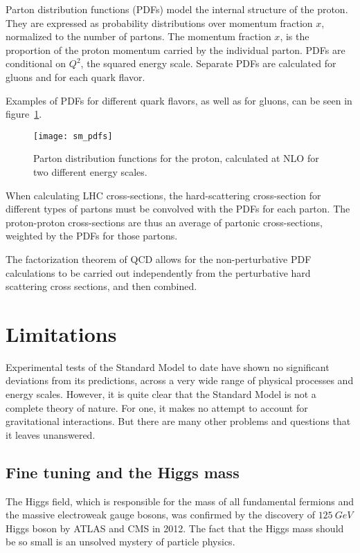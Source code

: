 Parton distribution functions (PDFs) model the internal structure of the proton.
They are expressed as probability distributions over momentum fraction $x$, normalized to the number of partons.
The momentum fraction $x$, is the proportion of the proton momentum carried by the individual parton.
PDFs are conditional on $Q^2$, the squared energy scale.
Separate PDFs are calculated for gluons and for each quark flavor.

Examples of PDFs for different quark flavors, as well as for gluons, can be seen in figure~\ref{fig:sm_pdfs}.

\begin{figure}[!ht]
    \centering
\texttt{[image: sm\_pdfs]}
\caption{Parton distribution functions for the proton, calculated at NLO for two different energy scales.}
\label{fig:sm_pdfs}
\end{figure}\cite{sm-pdf-2009}

When calculating LHC cross-sections, the hard-scattering cross-section for different types of partons
must be convolved with the PDFs for each parton.
The proton-proton cross-sections are thus an average of partonic cross-sections, weighted by the PDFs for those partons.

The factorization theorem of QCD allows for the non-perturbative PDF calculations to be carried out independently from
the perturbative hard scattering cross sections, and then combined.

\section{Limitations}\label{sec:sm_limits}

Experimental tests of the Standard Model to date have shown no significant deviations from its predictions,
across a very wide range of physical processes and energy scales.
However, it is quite clear that the Standard Model is not a complete theory of nature.
For one, it makes no attempt to account for gravitational interactions.
But there are many other problems and questions that it leaves unanswered.

\subsection{Fine tuning and the Higgs mass}\label{subsec:sm_hierarchy}

The Higgs field, which is responsible for the mass of all fundamental fermions and the massive electroweak gauge bosons,
was confirmed by the discovery of $125~GeV$ Higgs boson by ATLAS and CMS in 2012.
The fact that the Higgs mass should be so small is an unsolved mystery of particle physics.

